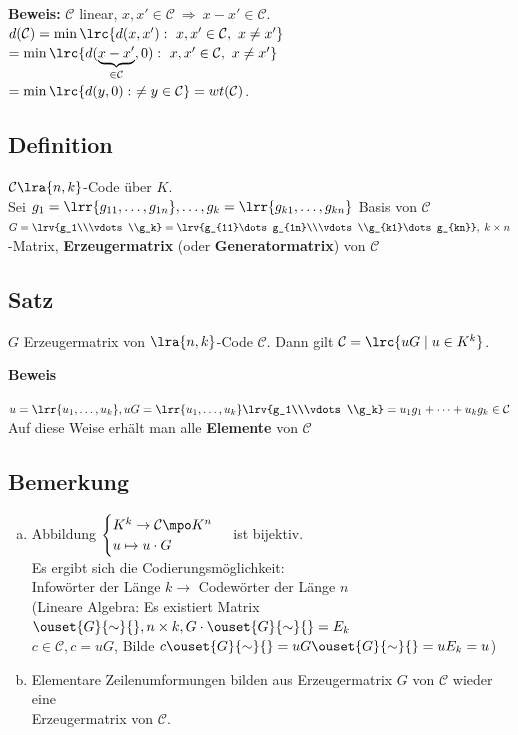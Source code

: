 		\textbf{Beweis:} $ \mathcal{C} $ linear, $ x,x'\in\mathcal{C}\ \Rightarrow\ x-x'\in\mathcal{C} $.\\
		$ d(\mathcal{C})=\min\lrc{d(x,x'):\ x,x'\in\mathcal{C},\ x\neq x'} $\\
		$ =\min\lrc{d(\underbrace{x-x'}_{\in\mathcal{C}},0):\ x,x'\in\mathcal{C},\ x\neq x'} $\\
		$ =\min\lrc{d(y,0):\  \neq y\in\mathcal{C}}=wt(\mathcal{C}) $.
		
	\subsection{Definition}
		$\mathcal{C}\lra{n,k}$-Code über $K$.\\
		Sei $g_1=\lrr{g_{11},\dots,g_{1n}},\dots,g_k=\lrr{g_{k1},\dots,g_{kn}}$ Basis von $\mathcal{C}$\\
		$G=\lrv{g_1\\\vdots\\g_k}=\lrv{g_{11}\dots g_{1n}\\\vdots\\g_{k1}\dots g_{kn}},\; k\times n$-Matrix, \textbf{Erzeugermatrix} (oder \textbf{Generatormatrix}) von $\mathcal{C}$

	\subsection{Satz}
		$G$ Erzeugermatrix von $\lra{n,k}$-Code $\mathcal{C}$. Dann gilt $\mathcal{C}=\lrc{uG\mid u\in K^k}$.

		\textbf{Beweis}

		$u=\lrr{u_1,\dots,u_k}, uG=\lrr{u_1,\dots,u_k}\lrv{g_1\\\vdots\\g_k}=u_1g_1+\dots+u_kg_k\in\mathcal{C}$\\
		Auf diese Weise erhält man alle \textbf{Elemente} von $\mathcal{C}$

	\subsection{Bemerkung}
		\begin{enumerate}[a)]
			\item Abbildung $\begin{cases} K^k\rightarrow\mathcal{C}\mpo K^n\\u\mapsto u\cdot G\end{cases}$ ist bijektiv.\\
				Es ergibt sich die Codierungsmöglichkeit:\\
				Infowörter der Länge $k\rightarrow$ Codewörter der Länge $n$\\
				(Lineare Algebra: Es existiert Matrix $\ouset{G}{\sim}{}, n\times k, G\cdot\ouset{G}{\sim}{}=E_k$\\
				$c\in\mathcal{C}, c=uG$, Bilde $c\ouset{G}{\sim}{}=uG\ouset{G}{\sim}{}=uE_k=u$)
			\item Elementare Zeilenumformungen bilden aus Erzeugermatrix $G$ von $\mathcal{C}$ wieder eine \\Erzeugermatrix von $\mathcal{C}$.
		\end{enumerate}


